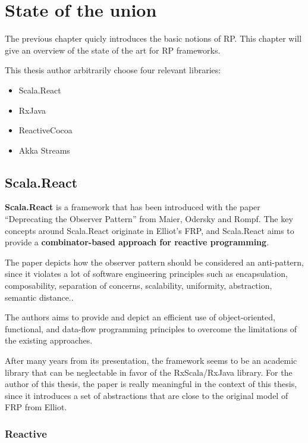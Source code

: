 \chapter{State of the union}\label{state-of-the-union}

The previous chapter quicly introduces the basic notions of RP. This
chapter will give an overview of the state of the art for RP frameworks.

This thesis author arbitrarily choose four relevant libraries:

\begin{itemize}
\itemsep1pt\parskip0pt
\item
  Scala.React
\item
  RxJava
\item
  ReactiveCocoa
\item
  Akka Streams
\end{itemize}

\section{Scala.React}\label{scala.react}

\textbf{Scala.React} is a framework that has been introduced with the
paper ``Deprecating the Observer Pattern'' from Maier, Odersky and
Rompf. The key concepts around Scala.React originate in Elliot's FRP,
and Scala.React aims to provide a \textbf{combinator-based approach for
reactive programming}.

The paper depicts how the observer pattern should be considered an
anti-pattern, since it violates a lot of software engineering principles
such as encapsulation, composability, separation of concerns,
scalability, uniformity, abstraction, semantic distance..

The authors aims to provide and depict an efficient use of
object-oriented, functional, and data-flow programming principles to
overcome the limitations of the existing approaches.

After many years from its presentation, the framework seems to be an
academic library that can be neglectable in favor of the RxScala/RxJava
library. For the author of this thesis, the paper is really meaningful
in the context of this thesis, since it introduces a set of abstractions
that are close to the original model of FRP from Elliot.

\subsection{Reactive}\label{reactive}

